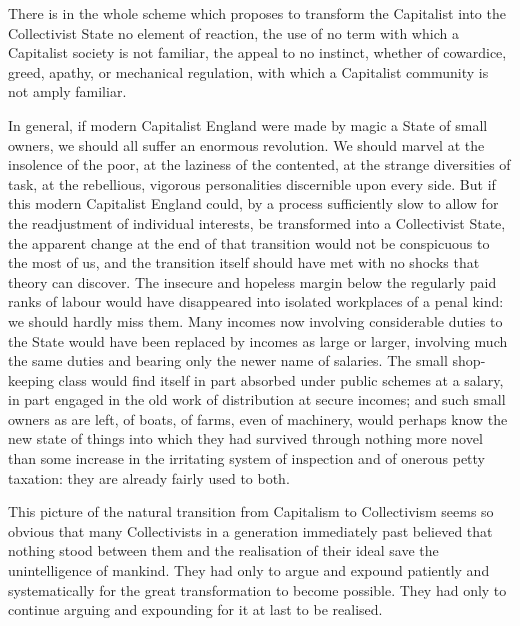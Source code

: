 \documentclass{book}
\begin{document}
There is in the whole scheme which proposes to transform the Capitalist into the Collectivist State no element of reaction, the use of no term with which a Capitalist society is not familiar, the appeal to no instinct, whether of cowardice, greed, apathy, or mechanical regulation, with which a Capitalist community is not amply familiar.

In general, if modern Capitalist England were made by magic a State of small owners, we should all suffer an enormous revolution. We should marvel at the insolence of the poor, at the laziness of the contented, at the strange diversities of task, at the rebellious, vigorous personalities discernible upon every side. But if this modern Capitalist England could, by a process sufficiently slow to allow for the readjustment of individual interests, be transformed into a Collectivist State, the apparent change at the end of that transition would not be conspicuous to the most of us, and the transition itself should have met with no shocks that theory can discover. The insecure and hopeless margin below the regularly paid ranks of labour would have disappeared into isolated workplaces of a penal kind: we should hardly miss them. Many incomes now involving considerable duties to the State would have been replaced by incomes as large or larger, involving much the same duties and bearing only the newer name of salaries. The small shop-keeping class would find itself in part absorbed under public schemes at a salary, in part engaged in the old work of distribution at secure incomes; and such small owners as are left, of boats, of farms, even of machinery, would perhaps know the new state of things into which they had survived through nothing more novel than some increase in the irritating system of inspection and of onerous petty taxation: they are already fairly used to both.

This picture of the natural transition from Capitalism to Collectivism seems so obvious that many Collectivists in a generation immediately past believed that nothing stood between them and the realisation of their ideal save the unintelligence of mankind. They had only to argue and expound patiently and systematically for the great transformation to become possible. They had only to continue arguing and expounding for it at last to be realised.
\end{document}
